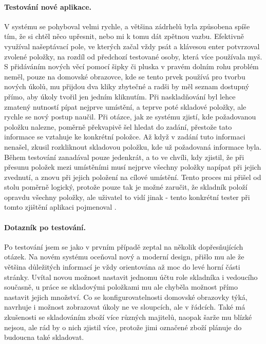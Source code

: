 \paragraph{Testování nové aplikace.} V systému se pohyboval velmi rychle, a většina zádrhelů byla způsobena spíše tím, že si chtěl něco upřesnit, nebo mi k tomu dát zpětnou vazbu. Efektivně využíval našeptávací pole, ve kterých začal vždy psát a klávesou enter potvrzoval zvolené položky, na rozdíl od předchozí testované osoby, která více používala myš. S přidáváním nových věcí pomocí šipky či pluska v pravém dolním rohu problém neměl, pouze na domovské obrazovce, kde se tento prvek používá pro tvorbu nových úkolů, mu přijdou dva kliky zbytečné a radši by měl seznam dostupný přímo, aby úkoly tvořil jen jedním kliknutím. Při naskladňování byl lehce zmatený nutností pípat nejprve umístění, a teprve poté skladové položky, ale rychle se nový postup naučil. Při otázce, jak ze systému zjistí, kde požadovanou položku nalezne, poměrně překvapivě šel hledat do zadání, přestože tato informace se vztahuje ke konkrétní položce. Až když v zadání tuto informaci nenašel, zkusil rozkliknout skladovou položku, kde už požadovaná informace byla. Během testování zanadával pouze jedenkrát, a to ve chvíli, kdy zjistil, že při přesunu položek mezi umístěními musí nejprve všechny položky napípat při jejich zvednutí, a znovu při jejich položení na cílové umístění. Tento proces mi přišel od stolu poměrně logický, protože pouze tak je možné zaručit, že skladník položí opravdu všechny položky, ale uživatel to vidí jinak - tento konkrétní tester při tomto zjištění aplikaci pojmenoval .

\paragraph{Dotazník po testování.} Po testování jsem se jako v prvním případě zeptal na několik dopřesňujících otázek. Na novém systému oceňoval nový a moderní design, přišlo mu ale že většina důležitých informací je vždy orientována až moc do levé horní části stránky. Uvítal novou možnost nastavit jednomu účtu role skladníka i vedoucího současně, u práce se skladovými položkami mu ale chyběla možnost přímo nastavit jejich množství. Co se konfigurovatelnosti domovské obrazovky týká, navrhuje i možnost zobrazovat úkoly ne ve sloupcích, ale v řádcích. Také má zkušenosti se skladováním zboží více různých majitelů, naopak šarže mu blízké nejsou, ale rád by o nich zjistil více, protože jimi označené zboží plánuje do budoucna také skladovat.

